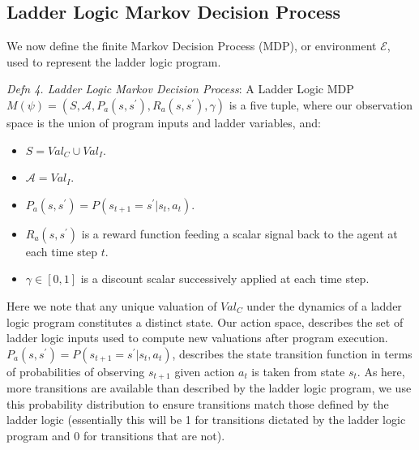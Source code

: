\documentclass[runningheads]{llncs}
\begin{document}
\subsection{Ladder Logic Markov Decision Process}\label{subsect:MDP}

We now define the finite Markov Decision Process (MDP), or environment $\mathcal{E}$, used to represent the ladder logic program. 

\textit{Defn 4. Ladder Logic Markov Decision Process}:
A Ladder Logic MDP $M(\psi) = (S,\mathcal{A},P_a(s,s^\prime), R_a(s,s^\prime),\gamma)$ is a five tuple, where our observation space is the union of program inputs and ladder variables, and:


\begin{itemize}
	\item $S = Val_C \cup Val_I$.
	\item $\mathcal{A} = Val_I$.
	\item $P_a(s,s^\prime) = P(s_{t+1} = s^\prime | s_t, a_t)$.
	\item $R_a(s,s^\prime)$ is a reward function feeding a scalar signal back to the agent at each time step $t$. 
	\item $\gamma \in [0,1]$ is a discount scalar successively applied at each time step.
\end{itemize}

Here we note that any unique valuation of $Val_C$ under the dynamics of a ladder logic program constitutes a distinct state. Our action space, describes the set of ladder logic inputs used to compute new valuations after program execution. $P_a(s,s^\prime) = P(s_{t+1} = s^\prime | s_t, a_t)$, describes the state transition function in terms of probabilities of observing $s_{t+1}$ given action $a_t$ is taken from state $s_t$. As here, more transitions are available than described by the ladder logic program, we use this probability distribution to ensure transitions match those defined by the ladder logic (essentially this will be 1 for transitions dictated by the ladder logic program and 0 for transitions that are not). 
\end{document}

